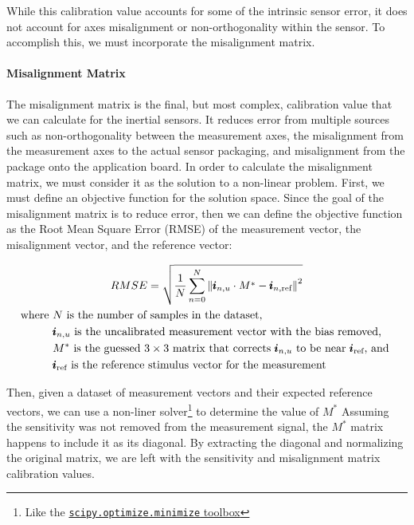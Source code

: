 While this calibration value accounts for some of the intrinsic sensor error, it does not account for axes misalignment or non-orthogonality within the sensor. To accomplish this, we must incorporate the misalignment matrix.

\paragraph*{Misalignment Matrix} The misalignment matrix is the final, but most complex, calibration value that we can calculate for the inertial sensors. It reduces error from multiple sources such as non-orthogonality between the measurement axes, the misalignment from the measurement axes to the actual sensor packaging, and misalignment from the package onto the application board. In order to calculate the misalignment matrix, we must consider it as the solution to a non-linear problem. First, we must define an objective function for the solution space. Since the goal of the misalignment matrix is to reduce error, then we can define the objective function as the Root Mean Square Error (RMSE) of the measurement vector, the misalignment vector, and the reference vector:

\begin{gather} \labeq{misalignment_obj_func}
    RMSE = \sqrt{\frac{1}{N}\sum_{n=0}^N{\|{\pmb{i}_{n,u} \cdot M^* -\pmb{i}_{n,\text{ref}}\|}^2}} \\
    \begin{aligned}
        \text{where } & N \text{ is the number of samples in the dataset,} \\
        & \pmb{i}_{n,u} \text{ is the uncalibrated measurement vector with the bias removed,} \\
        & M^* \text{ is the guessed $3 \times 3$ matrix that corrects $\pmb{i}_{n,u}$ to be near $\pmb{i}_{\text{ref}}$, and } \\
        & \pmb{i}_{\text{ref}} \text{ is the reference stimulus vector for the measurement}
    \end{aligned} \notag
\end{gather}

Then, given a dataset of measurement vectors and their expected reference vectors, we can use a non-liner solver\footnote{Like the \href{https://docs.scipy.org/doc/scipy/reference/generated/scipy.optimize.minimize.html}{\lstinline{scipy.optimize.minimize} toolbox}} to determine the value of $M^*$ 
Assuming the sensitivity was not removed from the measurement signal, the $M^*$ matrix happens to include it as its diagonal. 
By extracting the diagonal and normalizing the original matrix, we are left with the sensitivity and misalignment matrix calibration values.

